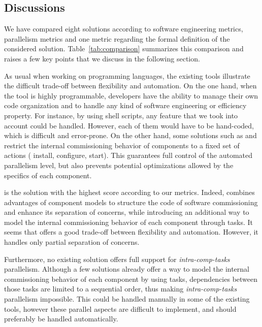 \subsection{Discussions}

We have compared eight solutions according to software engineering metrics, parallelism metrics and one metric regarding the formal definition of the considered solution. Table~\ref{tab:comparison} summarizes this comparison and raises a few key points that we discuss in the following section.

As usual when working on programming languages, the existing tools
illustrate the difficult trade-off between flexibility and
automation. On the one hand, when the tool is highly programmable,
developers have the ability to manage their own code organization and
to handle any kind of software engineering or efficiency property. For
instance, by using shell scripts, any feature that we took into
account could be handled. However, each of them would have to be
hand-coded, which is difficult and error-prone. On the other hand,
some solutions such as \deployware and \juju restrict the internal
commissioning behavior of components to a fixed set of actions (\eg
install, configure, start). This guarantees full control of the
automated parallelism level, but also prevents potential optimizations
allowed by the specifics of each component.

\aeolus is the solution with the highest score according to our
metrics. Indeed, \aeolus combines advantages of component models to
structure the code of software commissioning and enhance its
separation of concerns, while introducing an additional way to model
the internal commissioning behavior of each component through
tasks. It seems that \aeolus offers a good trade-off between
flexibility and automation. However, it handles only partial
separation of concerns.

Furthermore, no existing solution offers full support for
\emph{intra-comp-tasks} parallelism. Although a few solutions already
offer a way to model the internal commissioning behavior of each
component by using tasks, dependencies between those tasks are limited
to a sequential order, thus making \emph{intra-comp-tasks} parallelism
impossible. This could be handled manually in some of the existing
tools, however these parallel aspects are difficult to implement, and
should preferably be handled automatically.

